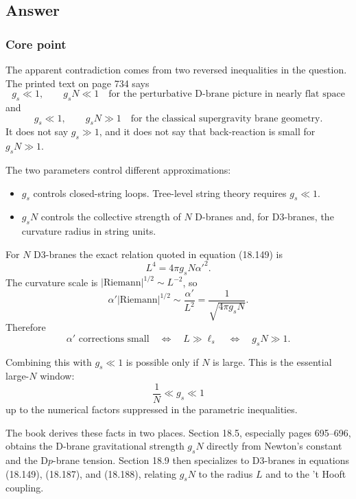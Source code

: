 \documentclass[
  10pt,
  a4paper,
  openany]{book}
\providecommand{\tightlist}{%
  \setlength{\itemsep}{0pt}\setlength{\parskip}{0pt}}
\begin{document}
\subsection{Answer}\label{answer-45}

\subsubsection{Core point}\label{core-point-45}

The apparent contradiction comes from two reversed inequalities in the
question. The printed text on page 734 says \[
\boxed{
g_s\ll1,
\qquad
g_sN\ll1
\quad
\text{for the perturbative D-brane picture in nearly flat space}
}
\] and \[
\boxed{
g_s\ll1,
\qquad
g_sN\gg1
\quad
\text{for the classical supergravity brane geometry}
}.
\] It does not say \(g_s\gg1\), and it does not say that back-reaction
is small for \(g_sN\gg1\).

The two parameters control different approximations:

\begin{itemize}
\tightlist
\item
  \(g_s\) controls closed-string loops. Tree-level string theory
  requires \(g_s\ll1\).
\item
  \(g_sN\) controls the collective strength of \(N\) D-branes and, for
  D3-branes, the curvature radius in string units.
\end{itemize}

For \(N\) D3-branes the exact relation quoted in equation (18.149) is \[
L^4=4\pi g_sN\alpha'^2.
\] The curvature scale is \(|\mathrm{Riemann}|^{1/2}\sim L^{-2}\), so \[
\alpha'|\mathrm{Riemann}|^{1/2}
\sim\frac{\alpha'}{L^2}
=\frac1{\sqrt{4\pi g_sN}}.
\] Therefore \[
\boxed{
\alpha'\text{ corrections small}
\quad\Longleftrightarrow\quad
L\gg\ell_s
\quad\Longleftrightarrow\quad
g_sN\gg1
}.
\]

Combining this with \(g_s\ll1\) is possible only if \(N\) is large. This
is the essential large-\(N\) window: \[
\boxed{
\frac1N\ll g_s\ll1
}
\] up to the numerical factors suppressed in the parametric
inequalities.

The book derives these facts in two places. Section 18.5, especially
pages 695--696, obtains the D-brane gravitational strength \(g_sN\)
directly from Newton's constant and the D\(p\)-brane tension. Section
18.9 then specializes to D3-branes in equations (18.149), (18.187), and
(18.188), relating \(g_sN\) to the radius \(L\) and to the 't Hooft
coupling.
\end{document}
